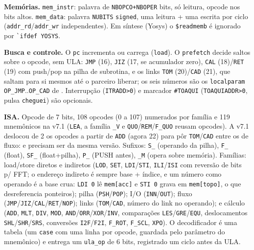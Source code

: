 \textbf{Memórias.} \lstinline|mem_instr|: palavra de \lstinline|NBOPCO+NBOPER| bits, só leitura, opcode nos bits altos. \lstinline|mem_data|: palavra \lstinline|NUBITS| \lstinline|signed|, uma leitura + uma escrita por ciclo (\lstinline|addr_rd|/\lstinline|addr_wr| independentes). Em síntese (Yosys) o \lstinline|$readmemb| é ignorado por \lstinline|`ifdef YOSYS|.

\textbf{Busca e controle.} O \lstinline|pc| incrementa ou carrega (\lstinline|load|). O \lstinline|prefetch| decide saltos sobre o opcode, sem ULA: \lstinline|JMP| (16), \lstinline|JIZ| (17, se acumulador zero), \lstinline|CAL| (18)/\lstinline|RET| (19) com push/pop na pilha de subrotina, e os links \lstinline|TOM| (20)/\lstinline|CAD| (21), que saltam para si mesmos até o parceiro liberar; os seis números são os \lstinline|localparam OP_JMP|..\lstinline|OP_CAD| de . Interrupção (\lstinline|ITRADD>0|) e marcador \lstinline|#TOAQUI| (\lstinline|TOAQUIADDR>0|, pulsa \lstinline|cheguei|) são opcionais.

\textbf{ISA.} Opcode de 7 bits, 108 opcodes (0 a 107) numerados por família e 119 mnemônicos na v7.1 (\lstinline|LEA|, a família \lstinline|_V| e \lstinline|QUO|/\lstinline|REM|/\lstinline|F_QUO| reusam opcodes). A v7.1 deslocou de 2 os opcodes a partir de \lstinline|ADD| (agora 22) para pôr \lstinline|TOM|/\lstinline|CAD| entre os de fluxo:  e  precisam ser da mesma versão. Sufixos: \lstinline|S_| (operando da pilha), \lstinline|F_| (float), \lstinline|SF_| (float+pilha), \lstinline|P_| (PUSH antes), \lstinline|_M| (opera sobre memória). Famílias: load/store diretos e indiretos (\lstinline|LOD|, \lstinline|SET|, \lstinline|LDI|/\lstinline|STI|, \lstinline|ILI|/\lstinline|ISI| com reversão de bits p/ FFT; o endereço indireto é sempre base + índice, e um número como operando é a base crua: \lstinline|LDI 0| lê \lstinline|mem[acc]| e \lstinline|STI 0| grava em \lstinline|mem[topo]|, o que desreferencia ponteiros); pilha (\lstinline|PSH|/\lstinline|POP|); I/O (\lstinline|INN|/\lstinline|OUT|); fluxo (\lstinline|JMP|/\lstinline|JIZ|/\lstinline|CAL|/\lstinline|RET|/\lstinline|NOP|); links (\lstinline|TOM|/\lstinline|CAD|, número do link no operando); e cálculo (\lstinline|ADD|, \lstinline|MLT|, \lstinline|DIV|, \lstinline|MOD|, \lstinline|AND|/\lstinline|ORR|/\lstinline|XOR|/\lstinline|INV|, comparações \lstinline|LES|/\lstinline|GRE|/\lstinline|EQU|, deslocamentos \lstinline|SHL|/\lstinline|SHR|/\lstinline|SRS|, conversões \lstinline|I2F|/\lstinline|F2I|, \lstinline|F_ROT|, \lstinline|F_SCL|, \lstinline|XPO|). O decodificador é uma tabela (um \lstinline|case| com uma linha por opcode, guardada pelo parâmetro do mnemônico) e entrega um \lstinline|ula_op| de 6 bits, registrado um ciclo antes da ULA.

